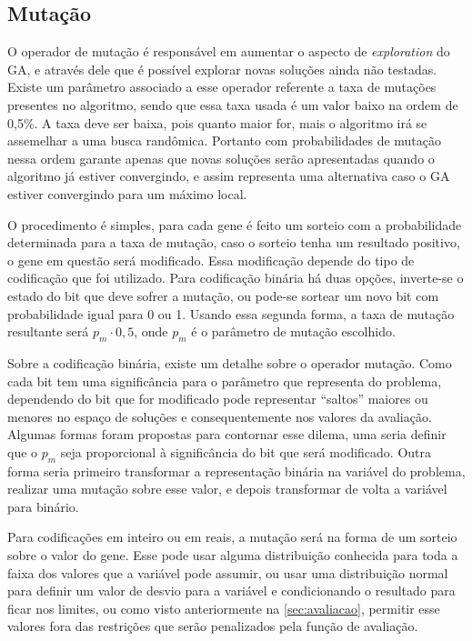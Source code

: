 \subsection{Mutação}
O operador de mutação é responsável em aumentar o aspecto de \textit{exploration} do GA, e através dele que é possível explorar novas soluções ainda não testadas. Existe um parâmetro associado a esse operador referente a taxa de mutações presentes no algoritmo, sendo que essa taxa usada é um valor baixo na ordem de 0,5\%. A taxa deve ser baixa, pois quanto maior for, mais o algoritmo irá se assemelhar a uma busca randômica. Portanto com probabilidades de mutação nessa ordem garante apenas que novas soluções serão apresentadas quando o algoritmo já estiver convergindo, e assim representa uma alternativa caso o GA estiver convergindo para um máximo local.

O procedimento é simples, para cada gene é feito um sorteio com a probabilidade determinada para a taxa de mutação, caso o sorteio tenha um resultado positivo, o gene em questão será modificado. Essa modificação depende do tipo de codificação que foi utilizado. Para codificação binária há duas opções, inverte-se o estado do bit que deve sofrer a mutação, ou pode-se sortear um novo bit com probabilidade igual para 0 ou 1. Usando essa segunda forma, a taxa de mutação resultante será \(p_m \cdot 0,5\), onde \(p_m\) é o parâmetro de mutação escolhido.

Sobre a codificação binária, existe um detalhe sobre o operador mutação. Como cada bit tem uma significância para o parâmetro que representa do problema, dependendo do bit que for modificado pode representar ``saltos'' maiores ou menores no espaço de soluções e consequentemente nos valores da avaliação. Algumas formas foram propostas para contornar esse dilema, uma seria definir que o \(p_m\) seja proporcional à significância do bit que será modificado. Outra forma seria primeiro transformar a representação binária na variável do problema, realizar uma mutação sobre esse valor, e depois transformar de volta a variável para binário.

Para codificações em inteiro ou em reais, a mutação será na forma de um sorteio sobre o valor do gene. Esse pode usar alguma distribuição conhecida para toda a faixa dos valores que a variável pode assumir, ou usar uma distribuição normal para definir um valor de desvio para a variável e condicionando o resultado para ficar nos limites, ou como visto anteriormente na \autoref{sec:avaliacao}, permitir esse valores fora das restrições que serão penalizados pela função de avaliação.

